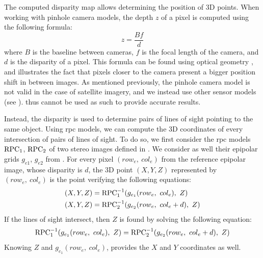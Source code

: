 The computed disparity map allows determining the position of 3D points. When working with pinhole camera models, the depth $z$ of a pixel is computed using the following formula:
\begin{equation}
	z=\frac{Bf}{d}\label{eq:z_bfd}
\end{equation}
where $B$ is the baseline between cameras, $f$ is the focal length of the camera, and $d$ is the disparity of a pixel. This formula can be found using optical geometry \cite{bolles_epipolar-plane_1987}, and illustrates the fact that pixels closer to the camera present a bigger position shift in between images. As mentioned previously, the pinhole camera model is not valid in the case of satellite imagery,  and we instead use other sensor models (see ).  thus cannot be used as such to provide accurate results.

Instead, the disparity is used to determine pairs of lines of sight pointing to the same object. Using \acrshort{rpc} models, we can compute the 3D coordinates of every intersection of pairs of lines of sight. To do so, we first consider the \acrshort{rpc} models $\mathrm{RPC}_1$, $\mathrm{RPC}_2$ of two stereo images defined in . We consider as well their epipolar grids $g_{e1}$, $g_{e2}$ from . For every pixel $(row_e, ~col_e)$ from the reference epipolar image, whose disparity is $d$, the 3D point $(X, Y, Z)$ represented by $(row_e, ~col_e)$ is the point verifying the following equations:
\begin{align}
    (X, Y, Z) &= \mathrm{RPC}^{-1}_1(g_{e_1}(row_e,~col_e),~Z)\label{eq:triangulation_exact}\\
    (X, Y, Z) &= \mathrm{RPC}^{-1}_2(g_{e_2}(row_e,~col_e+d),~Z) 
\end{align}
If the lines of sight intersect, then $Z$ is found by solving the following equation:
\begin{equation}
     \mathrm{RPC}^{-1}_1(g_{e_1}(row_e,~col_e),~Z) = \mathrm{RPC}^{-1}_2(g_{e_2}(row_e,~col_e+d),~Z) 
\end{equation}
Knowing $Z$ and $g_{e_1}(row_e,~col_e)$,  provides the $X$ and $Y$ coordinates as well.

